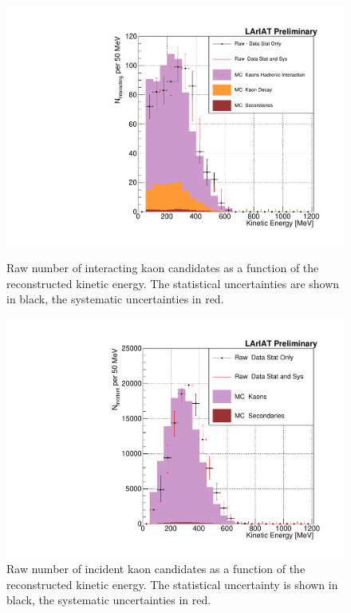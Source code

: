 \begin{figure}[]
\centering
\begin{minipage}[t]{0.45\textwidth}
\centering
\includegraphics[width=\textwidth]{Chapter-7/Images/Plots_MCData_Int_StatSystK_WithDK.pdf}
\caption{Raw number of interacting kaon candidates as a function of the reconstructed kinetic energy. The statistical uncertainties are shown in black, the systematic uncertainties in red.}
\label{fig:InteractingRawK}
\end{minipage}\hfill
\begin{minipage}[t]{0.45\textwidth}
\centering
\includegraphics[width=\textwidth]{Chapter-7/Images/Plots_MCData_Inc_StatSystK_WithDK.pdf}
\caption{Raw number of incident kaon candidates as a function of the reconstructed kinetic energy. The statistical uncertainty is shown in black, the systematic uncertainties in red.}
\label{fig:IncidentRawK}
\end{minipage}
\end{figure}



